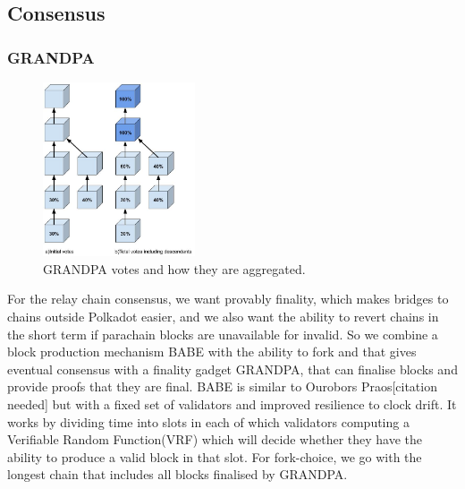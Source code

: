 \subsection{Consensus}






\subsubsection{GRANDPA} \label{sec:grandpa}
\begin{figure}[h!]
  \centering
  \includegraphics[width=0.4\textwidth]{images/Grandpa.jpg}
  \caption{GRANDPA votes and how they are aggregated.}
    \label{fig:grandpa}
\end{figure}
For the relay chain consensus, we want provably finality, which makes bridges to chains outside Polkadot easier, and we also want the ability to revert chains in the short term if parachain blocks are unavailable for invalid.
So we combine a block production mechanism BABE with the ability to fork and that gives eventual consensus with a finality gadget GRANDPA, that can finalise blocks and provide proofs that they are final.
BABE is similar to Ourobors Praos[citation needed] but with a fixed set of validators and improved resilience to clock drift.
It works by dividing time into slots in each of which validators computing a Verifiable Random Function(VRF) which will decide whether they have the ability to produce a valid block in that slot.
For fork-choice, we go with the longest chain that includes all blocks finalised by GRANDPA.
